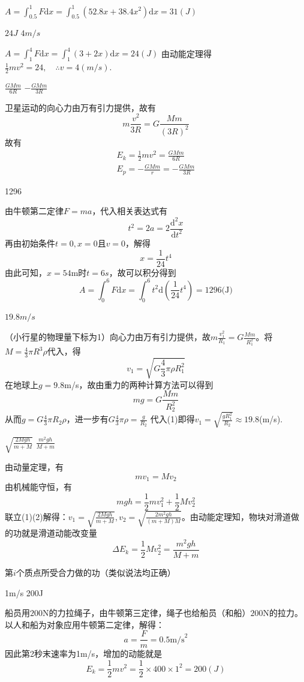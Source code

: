 \documentclass[b5paper,opensource,sourcefont,parskip]{qyxf-book}
\newcommand{\di}[1]{\mathrm{d}#1}
\newcommand{\ddy}[2]{\frac{\mathrm{d} ^2 #1}{\mathrm{d} #2 ^2}}
\begin{document}
\solve $A=\int_{0.5}^{1}F\di{x}=\int_{0.5}^{1}(52.8x+38.4x^2)\di{x}=31(J)$

$24J$ $4m/s$

\solve $A=\int_{1}^{4}F\di{x}=\int_{1}^{4}(3+2x)\di{x}=24(J)$
由动能定理得$\frac{1}{2}mv^2=24,\quad \therefore v=4(m/s)$.

$\frac{GMm}{6R}$ \qquad $-\frac{GMm}{3R}$

\solve 卫星运动的向心力由万有引力提供，故有
\[m\frac{v^2}{3R}=G\frac{Mm}{(3R)^2}\]
故有
\begin{gather*}
E_k=\frac{1}{2}mv^2=\frac{GMm}{6R}\\
E_p=-\frac{GMm}{r}=-\frac{GMm}{3R}
\end{gather*}

1296

\solve
由牛顿第二定律$F=ma$，代入相关表达式有
\[t^2=2a=2\ddy{x}{t}\]
再由初始条件$t=0,x=0$且$v=0$，解得
\[x=\frac{1}{24}t^4\]
由此可知，$x=54$m时$t=6s$，故可以积分得到
\[A=\int_{0}^{6}F\di{x}=\int_{0}^{6}t^2\di{(\frac{1}{24}t^4)}=1296\text{(J)}\]


$19.8m/s$

\solve
（小行星的物理量下标为1）向心力由万有引力提供，故$m\frac{v_1^2}{R_1}=G\frac{Mm}{R_1^2}$。将$M=\frac{4}{3}\pi R^3\rho$代入，得
\[v_1=\sqrt{G\frac{4}{3}\pi\rho R_1^2}\]
在地球上$g=9.8$m/s，故由重力的两种计算方法可以得到
\[mg=G\frac{Mm}{R_2^2}\]
从而$g=G\frac{4}{3}\pi R_2\rho$，进一步有$G\frac{4}{3}\pi\rho=\frac{g}{R_2}$
代入(1)即得$v_1=\sqrt{\frac{gR_1^2}{R_2}}\approx19.8$(m/s).

 $\sqrt{\frac{2Mgh}{m+M}}$ \qquad $\frac{m^2gh}{M+m}$

\solve 由动量定理，有
\begin{equation}
mv_1=Mv_2
\end{equation}
由机械能守恒，有
\begin{equation}
mgh=\frac{1}{2}mv_1^2+\frac{1}{2}Mv_2^2
\end{equation}
联立(1)(2)解得：$v_1=\sqrt{\frac{2Mgh}{m+M}}
,v_2=\sqrt{\frac{2m^2gh}{(m+M)M}}$。由动能定理知，物块对滑道做的功就是滑道动能改变量
\[\Delta E_k=\frac{1}{2}Mv_2^2=\frac{m^2gh}{M+m}\]

 第$i$个质点所受合力做的功（类似说法均正确）

1m/s \qquad 200J

\solve 船员用$200$N的力拉绳子，由牛顿第三定律，绳子也给船员（和船）$200$N的拉力。以人和船为对象应用牛顿第二定律，解得：
\[a=\frac{F}{m}=0.5\text{m/s}^2\]
因此第2秒末速率为1m/s，增加的动能就是
\[E_k=\frac{1}{2}mv^2=\frac{1}{2}\times400\times1^2=200(J)\]
\end{document}
